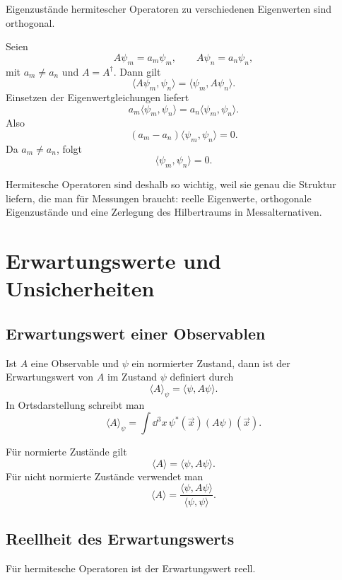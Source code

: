 Eigenzustände hermitescher Operatoren zu verschiedenen Eigenwerten sind orthogonal.

\begin{derivationbox}
Seien
\[
    A\psi_m=a_m\psi_m,
    \qquad
    A\psi_n=a_n\psi_n,
\]
mit $a_m\ne a_n$ und $A=A^\dagger$. Dann gilt
\[
    \langle A\psi_m,\psi_n\rangle
    =\langle \psi_m,A\psi_n\rangle.
\]
Einsetzen der Eigenwertgleichungen liefert
\[
    a_m\langle \psi_m,\psi_n\rangle
    =a_n\langle \psi_m,\psi_n\rangle.
\]
Also
\[
    (a_m-a_n)\langle \psi_m,\psi_n\rangle=0.
\]
Da $a_m\ne a_n$, folgt
\[
    \langle \psi_m,\psi_n\rangle=0.
\]
\end{derivationbox}

\begin{conceptbox}
Hermitesche Operatoren sind deshalb so wichtig, weil sie genau die Struktur liefern, die man für Messungen braucht: reelle Eigenwerte, orthogonale Eigenzustände und eine Zerlegung des Hilbertraums in Messalternativen.
\end{conceptbox}

\section{Erwartungswerte und Unsicherheiten}

\subsection{Erwartungswert einer Observablen}

Ist $A$ eine Observable und $\psi$ ein normierter Zustand, dann ist der Erwartungswert von $A$ im Zustand $\psi$ definiert durch
\[
    \langle A\rangle_\psi=\langle \psi,A\psi\rangle.
\]
In Ortsdarstellung schreibt man
\[
    \langle A\rangle_\psi
    =\int \dd^3x\,\psi^*(\vec x)(A\psi)(\vec x).
\]

\begin{formulabox}
Für normierte Zustände gilt
\[
    \langle A\rangle=\langle \psi,A\psi\rangle.
\]
Für nicht normierte Zustände verwendet man
\[
    \langle A\rangle=\frac{\langle \psi,A\psi\rangle}{\langle\psi,\psi\rangle}.
\]
\end{formulabox}

\subsection{Reellheit des Erwartungswerts}

Für hermitesche Operatoren ist der Erwartungswert reell.

